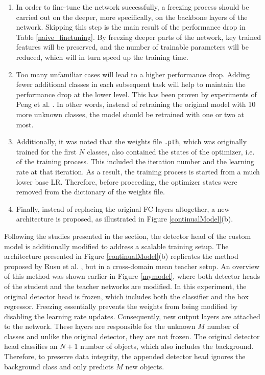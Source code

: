 \documentclass[english, 12pt, a4paper, elec, utf8, a-1b, online]{aaltothesis}
\begin{document}
\begin{enumerate}
\item In order to fine-tune the network successfully, a freezing process should be carried out on the deeper, more specifically, on the backbone layers of the network. Skipping this step is the main result of the performance drop in Table \ref{naive_finetuning}. By freezing deeper parts of the network, key trained features will be preserved, and the number of trainable parameters will be reduced, which will in turn speed up the training time. 
\item Too many unfamiliar cases will lead to a higher performance drop. Adding fewer additional classes in each subsequent task will help to maintain the performance drop at the lower level. This has been proven by experiments of Peng et al. \cite{Peng2020}. In other words, instead of retraining the original model with 10 more unknown classes, the model should be retrained with one or two at most. 
\item Additionally, it was noted that the weights file \texttt{.pth}, which was originally trained for the first $N$ classes, also contained the states of the optimizer, i.e. of the training process. This included the iteration number and the learning rate at that iteration. As a result, the training process is started from a much lower base LR. Therefore, before proceeding, the optimizer states were removed from the dictionary of the weights file. 
\item Finally, instead of replacing the original FC layers altogether, a new architecture is proposed, as illustrated in Figure \ref{continualModel}(b). 
\end{enumerate}

Following the studies presented in the  section, the detector head of the custom model is additionally modified to address a scalable training setup. The architecture presented in Figure \ref{continualModel}(b) replicates the method proposed by Rusu et al. \cite{Rusu2016}, but in a cross-domain mean teacher setup. An overview of this method was shown earlier in Figure \ref{mymodel}, where both detector heads of the student and the teacher networks are modified. In this experiment, the original detector head is frozen, which includes both the classifier and the box regressor. Freezing essentially prevents the weights from being modified by disabling the learning rate updates. Consequently, new output layers are attached to the network. These layers are responsible for the unknown $M$ number of classes and unlike the original detector, they are not frozen. The original detector head classifies an $N+1$ number of objects, which also includes the background. Therefore, to preserve data integrity, the appended detector head ignores the background class and only predicts $M$ new objects. 
\end{document}
